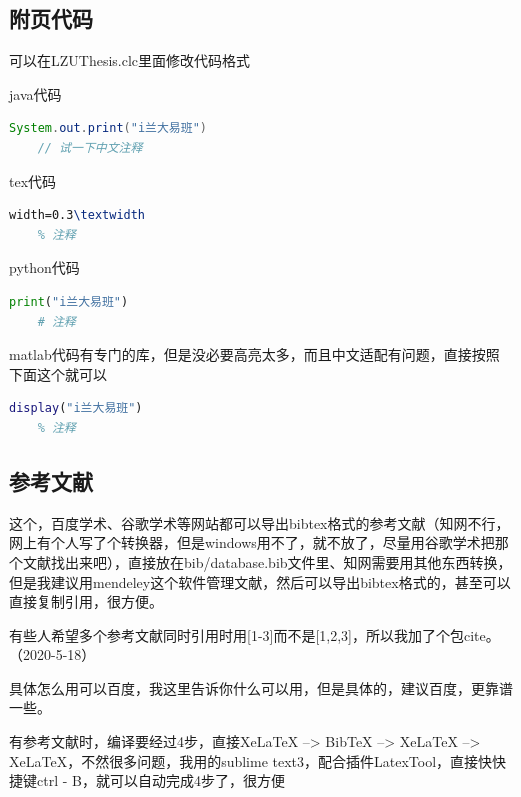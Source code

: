 \documentclass[AutoFakeBold]{LZUThesis2007}
\begin{document}
\subsection{附页代码} %
\label{sub:附页代码}
可以在LZUThesis.clc里面修改代码格式

java代码
\begin{lstlisting}[language = java]
    System.out.print("i兰大易班")
    // 试一下中文注释
\end{lstlisting}


tex代码
\begin{lstlisting}[language = tex]
    width=0.3\textwidth
    % 注释
\end{lstlisting}

python代码
\begin{lstlisting}[language = python]
    print("i兰大易班")
    # 注释
\end{lstlisting}

matlab代码有专门的库，但是没必要高亮太多，而且中文适配有问题，直接按照下面这个就可以
\begin{lstlisting}[language = matlab]
    display("i兰大易班")
    % 注释
\end{lstlisting}


\subsection{参考文献} %
\label{sub:参考文献}

这个，百度学术、谷歌学术等网站都可以导出bibtex格式的参考文献（知网不行，网上有个人写了个转换器，但是windows用不了，就不放了，尽量用谷歌学术把那个文献找出来吧），直接放在bib/database.bib文件里、知网需要用其他东西转换，但是我建议用mendeley这个软件管理文献，然后可以导出bibtex格式的，甚至可以直接复制引用，很方便\cite{partl2016, tenne1992polyhedral, tussyadiah2015hotels}。

有些人希望多个参考文献同时引用时用[1-3]而不是[1,2,3]，所以我加了个包cite。（2020-5-18）

具体怎么用可以百度，我这里告诉你什么可以用，但是具体的，建议百度，更靠谱一些。


有参考文献时，编译要经过4步，直接XeLaTeX --> BibTeX --> XeLaTeX --> XeLaTeX，不然很多问题，我用的sublime text3，配合插件LatexTool，直接快快捷键ctrl - B，就可以自动完成4步了，很方便


\end{document}
